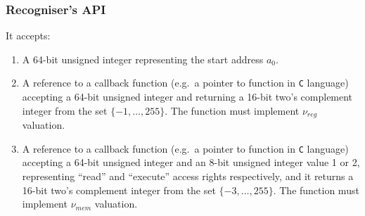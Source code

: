 \documentclass[10pt,twocolumn]{article}
\begin{document}
\subsubsection{Recogniser's API}
\label{sec:MAL:recogniser:api}

It accepts:
\begin{enumerate}
\item A 64-bit unsigned integer representing the start address $ a_0 $. %
\item A reference to a callback function (e.g.~a pointer to function in
\texttt{C} language) accepting a 64-bit unsigned integer and returning a 16-bit
two's complement integer from the set $ \{-1,\ldots,255\} $. The function must
implement $ \nu_\mathit{reg} $ valuation. %
\item A reference to a callback function (e.g.~a pointer to function in
\texttt{C} language) accepting a 64-bit unsigned integer and an 8-bit unsigned
integer value 1 or 2, representing ``read'' and ``execute'' access rights
respectively, and it returns a 16-bit two's complement integer from the set $
\{-3,\ldots,255\} $. The function must implement $ \nu_\mathit{mem} $ valuation.
%
\end{enumerate}
\end{document}
